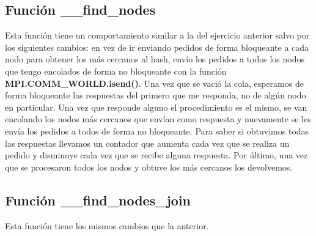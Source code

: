 \subsection{Función \_\_find\_nodes}
Esta función tiene un comportamiento similar a la del ejercicio anterior salvo por los siguientes cambios: en vez de ir enviando pedidos de forma bloqueante a cada nodo para obtener los más cercanos al hash, envío los pedidos a todos los nodos que tengo encolados de forma no bloqueante con la función \textbf{MPI.COMM\_WORLD.isend()}. Una vez que se vació la cola, esperamos de forma bloqueante las respuestas del primero que me responda, no de algún nodo en particular. Una vez que responde alguno el procedimiento es el mismo, se van encolando los nodos más cercanos que envían como respuesta y nuevamente se les envía los pedidos a todos de forma no bloqueante. Para saber si obtuvimos todas las respuestas llevamos un contador que aumenta cada vez que se realiza un pedido y disminuye cada vez que se recibe alguna respuesta. Por último, una vez que se procesaron todos los nodos y obtuve los más cercanos los devolvemos.

\subsection{Función \_\_find\_nodes\_join}
Esta función tiene los mismos cambios que la anterior.

